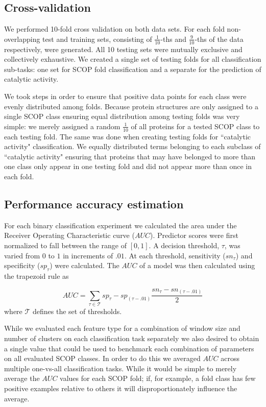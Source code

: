 \subsection{Cross-validation}

We performed 10-fold cross validation on both data sets. For each fold non-overlapping test and training sets, consisting of $\frac{1}{10}$-ths and $\frac{9}{10}$-ths of the data respectively, were generated. All 10 testing sets were mutually exclusive and collectively exhaustive.  We created a single set of testing folds for all classification sub-tasks: one set for SCOP fold classification and a separate for the prediction of catalytic activity.  

We took steps in order to ensure that positive data points for each class were evenly distributed among folds.  Because protein structures are only assigned to a single SCOP class ensuring equal distribution among testing folds was very simple: we merely assigned a random $\frac{1}{10}$ of all proteins for a tested SCOP class to each testing fold.  The same was done when creating testing folds for ``catalytic activity" classification. We equally distributed terms belonging to each subclass of ``catalytic activity" ensuring that proteins that may have belonged to more than one class only appear in one testing fold and did not appear more than once in each fold.  

\subsection{Performance accuracy estimation}

For each binary classification experiment we calculated the area under the Receiver Operating Characteristic curve ($AUC$).  Predictor scores were first normalized to fall between the range of $[0,1]$.  A decision threshold, $\tau$, was varied from $0$ to $1$ in increments of $.01$.  At each threshold, sensitivity ($sn_{\tau}$) and specificity ($sp_{\tau}$) were calculated.  The $AUC$ of a model was then calculated using the trapezoid rule as 

\[
AUC = \sum_{\tau \in \mathcal{T}} sp_{\tau} - sp_{(\tau -.01)}  \frac{ sn_{\tau} - sn_{(\tau -.01)} }{2}
\]
where $\mathcal{T}$ defines the set of thresholds.

While we evaluated each feature type for a combination of window size and number of clusters on each classification task separately we also desired to obtain a single value that could be used to benchmark each combination of parameters on all evaluated SCOP classes. In order to do this we averaged $AUC$ across multiple one-vs-all classification tasks. While it would be simple to merely average the $AUC$ values for each SCOP fold; if, for example, a fold class has few positive examples relative to others it will disproportionately influence the average.

